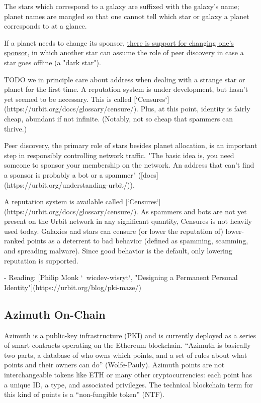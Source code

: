 {{{The stars which correspond to a galaxy are suffixed with the galaxy's name; planet names are mangled so that one cannot tell which star or galaxy a planet corresponds to at a glance.

If a planet needs to change its sponsor, \href{https://urbit.org/using/operations/using-your-ship/#escaping-a-sponsor}{there is support for changing one's sponsor}, in which another star can assume the role of peer discovery in case a star goes offline (a "dark star").

TODO we in principle care about address when dealing with a strange star or planet for the first time.  A reputation system is under development, but hasn't yet seemed to be necessary.  This is called [`Censures`](https://urbit.org/docs/glossary/censure/).  Plus, at this point, identity is fairly cheap, abundant if not infinite.  (Notably, not so cheap that spammers can thrive.)

Peer discovery, the primary role of stars besides planet allocation, is an important step in responsibly controlling network traffic.  "The basic idea is, you need someone to sponsor your membership on the network. An address that can't find a sponsor is probably a bot or a spammer" ([docs](https://urbit.org/understanding-urbit/)).

A reputation system is available called [`Censures`](https://urbit.org/docs/glossary/censure/).  As spammers and bots are not yet present on the Urbit network in any significant quantity, Censures is not heavily used today.  Galaxies and stars can censure (or lower the reputation of) lower-ranked points as a deterrent to bad behavior (defined as spamming, scamming, and spreading malware).  Since good behavior is the default, only lowering reputation is supported.

- Reading: [Philip Monk `~wicdev-wisryt`, "Designing a Permanent Personal Identity"](https://urbit.org/blog/pki-maze/)


\subsection{Azimuth On-Chain}

Azimuth is a public-key infrastructure (PKI) and is currently deployed as a series of smart contracts operating on the Ethereum blockchain.  ``Azimuth is basically two parts, a database of who owns which points, and a set of rules about what points and their owners can do'' (Wolfe-Pauly).  Azimuth points are not interchangeable tokens like ETH or many other cryptocurrencies:  each point has a unique ID, a type, and associated privileges.  The technical blockchain term for this kind of points is a ``non-fungible token'' (NTF).

}}}
